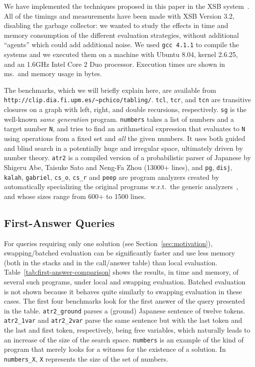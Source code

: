 \documentclass{./tlp}
\newcommand{\redsect}{\vspace{-1em}}
\begin{document}
We have implemented the techniques proposed in this paper in the XSB
system~\cite{xsb}.  All of the timings and measurements have been made
with XSB Version 3.2, disabling the garbage collector: we wanted to
study the effects in time and memory consumption of the different
evaluation strategies, without additional ``agents'' which could add
additional noise.
We used \lstinline{gcc 4.1.1} to compile the systems and we executed
them on a machine with Ubuntu 8.04, kernel 2.6.25, and an 1.6GHz Intel
Core 2 Duo processor.  Execution times are shown in ms.\ and memory
usage in bytes.

The benchmarks, which we will briefly explain here, are available from
\texttt{http://clip.dia.fi.upm.es/\~{}pchico/tabling/}.
\lstinline{tcl}, \lstinline{tcr}, and \lstinline{tcn} are transitive
closures on a graph with left, right, and double recursions,
respectively.  \lstinline{sg} is the well-known \emph{same generation}
program.  \lstinline{numbers} takes a list of numbers and a target
number \lstinline{N}, and tries to find an arithmetical expression
that evaluates to \lstinline{N} using operations from a fixed set and
\emph{all} the given numbers.  It uses both guided and blind search in
a potentially huge and irregular space, ultimately driven by number
theory.
\lstinline{atr2} is a compiled version of a probabilistic parser of
Japanese by Shigeru Abe, Taisuke Sato and Neng-Fa Zhou (13000+ lines), and
\lstinline{pg}, \lstinline{disj}, \lstinline{kalah},
\lstinline{gabriel}, \lstinline{cs_o}, \lstinline{cs_r} and
\lstinline{peep} are program analyzers created by automatically
specializing the original programs w.r.t.\ the generic
analyzers~\cite{codish98:analysis_with_XSB}, and whose sizes range
from 600+ to 1500 lines.


\redsect
\subsection{First-Answer Queries}
\label{sec:first-answer}

For queries requiring only one solution (see
Section~\ref{sec:motivation}), swapping/batched evaluation can be
significantly faster and use less memory (both in the stacks and in
the call/answer table) than local evaluation.
Table~\ref{tab:first-answer-comparison} shows the results, in time and
memory, of several such programs, under local and swapping evaluation.
Batched evaluation is not shown because it behaves quite similarly to
swapping evaluation in these cases.
The first four benchmarks look for the first answer of the query
presented in the table.
\lstinline{atr2_ground} parses a (ground) Japanese sentence of twelve
tokens. \lstinline{atr2_1var} and \lstinline{atr2_2var} parse the same
sentence but with the last token and the last and first token,
respectively, being free variables, which naturally leads to an
increase of the size of the search space.
\lstinline{numbers} is an example of the kind of program that merely
looks for a witness for the existence of a solution.  In
\lstinline{numbers_X}, \lstinline{X} represents the size of the set of
numbers.
\end{document}
